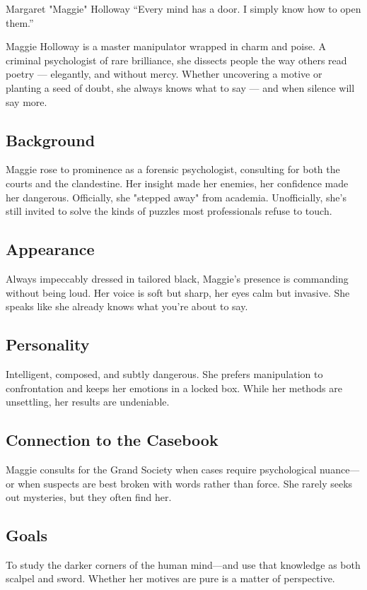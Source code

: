 \begin{WyrdCharacterSheet}
    {Margaret "Maggie" Holloway} 
    {“Every mind has a door. I simply know how to open them.”}
    \label{pc:maggie-holloway}

    \raggedright
    Maggie Holloway is a master manipulator wrapped in charm and poise. A criminal psychologist of rare brilliance, she dissects people the way others read poetry — elegantly, and without mercy. Whether uncovering a motive or\\ planting a seed of doubt, she always knows what to say — and when silence will say more.

    \subsection{Background}
    Maggie rose to prominence as a forensic psychologist, consulting for both the courts and the clandestine. Her insight made her enemies, her confidence made her dangerous. Officially, she "stepped away" from academia. Unofficially, she's still invited to solve the kinds of puzzles most professionals refuse to touch.

    \subsection{Appearance}
    Always impeccably dressed in tailored black, Maggie's presence is commanding without being loud. Her voice is soft but sharp, her eyes calm but invasive. She speaks like she already knows what you're about to say.

    \subsection{Personality}
    Intelligent, composed, and subtly dangerous. She prefers manipulation to confrontation and keeps her emotions in a locked box. While her methods are unsettling, her results are undeniable.

    \subsection{Connection to the Casebook}
    Maggie consults for the Grand Society when cases require psychological nuance—or when suspects are best broken with words rather than force. She rarely seeks out mysteries, but they often find her.

    \subsection{Goals}
    To study the darker corners of the human mind—and use that knowledge as both scalpel and sword. Whether her motives are pure is a matter of perspective.


\end{WyrdCharacterSheet}
